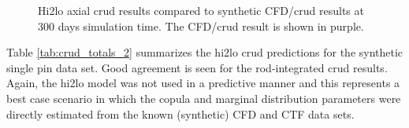 \begin{figure}[H]%
    \captionsetup[subfigure]{justification=centering}
    \centering
    \hspace*{-1.0em}%
    \caption[Hi2lo axial crud results compared to synthetic CFD/crud results at 300 days simulation time.]{Hi2lo axial crud results compared to synthetic CFD/crud results at 300 days simulation time.  The CFD/crud result is shown in purple.}%
    \label{fig:hi2lopincmass}%
\end{figure}


Table \ref{tab:crud_totals_2} summarizes the hi2lo crud predictions for the synthetic single pin data set.  Good agreement is seen for the rod-integrated crud results.  Again, the hi2lo model was not used in a predictive manner and this represents a best case scenario in which the copula and marginal distribution parameters were directly estimated from the known (synthetic) CFD and CTF data sets.

